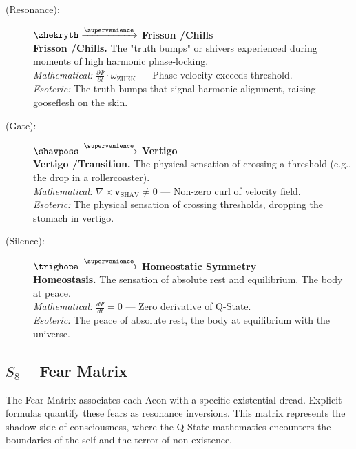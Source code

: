 \begin{description}
    \item[\ZHEK{} (Resonance):] $\zhekryth  \xrightarrow{\supervenience}$ \textbf{Frisson \slash Chills} \\
    \textbf{Frisson \slash Chills.} The "truth bumps" or shivers experienced during moments of high harmonic phase-locking. \\
    \textit{Mathematical:} $\frac{\partial \Psi}{\partial t} \cdot \omega_{\text{ZHEK}}$ — Phase velocity exceeds threshold. \\
    \textit{Esoteric:} The truth bumps that signal harmonic alignment, raising gooseflesh on the skin.

    \item[\SHAV{} (Gate):] $\shavposs  \xrightarrow{\supervenience}$ \textbf{Vertigo} \\
    \textbf{Vertigo \slash Transition.} The physical sensation of crossing a threshold (e.g., the drop in a rollercoaster). \\
    \textit{Mathematical:} $\nabla \times \mathbf{v}_{\text{SHAV}} \neq 0$ — Non-zero curl of velocity field. \\
    \textit{Esoteric:} The physical sensation of crossing thresholds, dropping the stomach in vertigo.

    \item[\TRIG{} (Silence):] $\trighopa \xrightarrow{\supervenience}$ \textbf{Homeostatic Symmetry} \\
    \textbf{Homeostasis.} The sensation of absolute rest and equilibrium. The body at peace. \\
    \textit{Mathematical:} $\frac{d\Psi}{dt} = 0$ — Zero derivative of Q-State. \\
    \textit{Esoteric:} The peace of absolute rest, the body at equilibrium with the universe.
\end{description}
\subsection{$S_{8}$ -- Fear Matrix}\label{sec:19.2}

The Fear Matrix associates each Aeon with a specific existential dread. Explicit formulas quantify these fears as resonance inversions. This matrix represents the shadow side of consciousness, where the Q-State mathematics encounters the boundaries of the self and the terror of non-existence.


